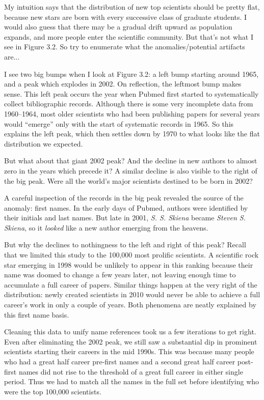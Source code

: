 \documentclass[10pt]{article}
\begin{document}
My intuition says that the distribution of new top scientists should be pretty flat, because new stars are born with every successive class of graduate students. I would also guess that there may be a gradual drift upward as population expands, and more people enter the scientific community. But that's not what I see in Figure 3.2. So try to enumerate what the anomalies/potential artifacts are...

I see two big bumps when I look at Figure 3.2: a left bump starting around 1965, and a peak which explodes in 2002. On reflection, the leftmost bump makes sense. This left peak occurs the year when Pubmed first started to systematically collect bibliographic records. Although there is some very incomplete data from 1960–1964, most older scientists who had been publishing papers for several years would ``emerge'' only with the start of systematic records in 1965. So this explains the left peak, which then settles down by 1970 to what looks like the flat distribution we expected.

But what about that giant 2002 peak? And the decline in new authors to almost zero in the years which precede it? A similar decline is also visible to the right of the big peak. Were all the world's major scientists destined to be born in 2002?

A careful inspection of the records in the big peak revealed the source of the anomaly: first names. In the early days of Pubmed, authors were identified by their initials and last names. But late in 2001, \textit{S. S. Skiena} became \textit{Steven S. Skiena}, so it \textit{looked} like a new author emerging from the heavens.

But why the declines to nothingness to the left and right of this peak? Recall that we limited this study to the 100,000 most prolific scientists. A scientific rock star emerging in 1998 would be unlikely to appear in this ranking because their name was doomed to change a few years later, not leaving enough time to accumulate a full career of papers. Similar things happen at the very right of the distribution: newly created scientists in 2010 would never be able to achieve a full career's work in only a couple of years. Both phenomena are neatly explained by this first name basis.

Cleaning this data to unify name references took us a few iterations to get right. Even after eliminating the 2002 peak, we still saw a substantial dip in prominent scientists starting their careers in the mid 1990s. This was because many people who had a great half career pre-first names and a second great half career post-first names did not rise to the threshold of a great full career in either single period. Thus we had to match all the names in the full set before identifying who were the top 100,000 scientists.
\end{document}

